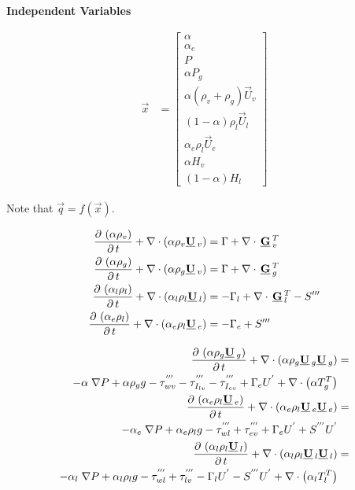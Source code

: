 \begin{minipage}{0.42\textwidth}
\begin{center}\textbf{Independent Variables}\end{center}
\begin{align}
\Vec{x} & = \begin{bmatrix}
\alpha \\
\alpha_e \\
P \\
\alpha P_g \\
\alpha \left( \rho_v + \rho_g \right) \Vec{U}_v \\
\left( 1-\alpha \right) \rho_l \Vec{U}_l \\
\alpha_e  \rho_l \Vec{U}_e \\
\alpha H_v \\
\left( 1-\alpha \right) H_l
\end{bmatrix}
\end{align}
\end{minipage}

Note that $\displaystyle \Vec{q}=f(\Vec{x})$.

\begin{align}
\Ddt{\alpha   \rho_v}{\Vec{U}_v} & =  \Gamma   + \DivOne{\Vec{G}_v^{T}}\\
\Ddt{\alpha   \rho_g}{\Vec{U}_v} & =  \Gamma   + \DivOne{\Vec{G}_g^{T}}\\
\Ddt{\alpha_l \rho_l}{\Vec{U}_l} & = -\Gamma_l + \DivOne{\Vec{G}_l^{T}} - S''' \\
\Ddt{\alpha_e \rho_l}{\Vec{U}_e} & = -\Gamma_e + S'''
\end{align}


\begin{align}
\Ddt{\alpha \rho_g \Vec{U}_g }{\Vec{U}_g} & = \nonumber \\
-\alpha\;\nabla P + \alpha \rho_g g - \tau^{'''}_{wv}-\tau^{'''}_{I_{lv}}-\tau^{'''}_{I_{ev}}+\Gamma_e U^{'}+\Div{\alpha T_g^{T}} & \\
\Ddt{\alpha_e \rho_l \Vec{U}_e}{\Vec{U}_e} & = \nonumber \\
-\alpha_e\;\nabla P + \alpha_e \rho_l g - \tau^{'''}_{wl}+\tau^{'''}_{ev}+\Gamma_e U^{'}+S^{'''}U^{'} & \\
\Ddt{\alpha_l \rho_l \Vec{U}_l}{\Vec{U}_l} & = \nonumber \\
-\alpha_l\;\nabla P + \alpha_l \rho_l g - \tau^{'''}_{wl}+\tau^{'''}_{lv}-\Gamma_l U^{'}-S^{'''}U^{'}+\Div{\alpha_l T_l^{T}} &
\end{align}

